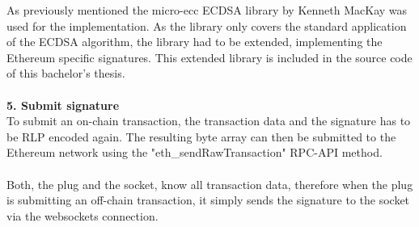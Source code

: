 As previously mentioned the micro-ecc ECDSA library by Kenneth MacKay was used for the implementation. As the library only covers the standard application of the ECDSA algorithm, the library had to be extended, implementing the Ethereum specific signatures. This extended library is included in the source code of this bachelor’s thesis.
\\\\
\textbf{5. Submit signature}\\
To submit an on-chain transaction, the transaction data and the signature has to be RLP encoded again. The resulting byte array can then be submitted to the Ethereum network using the "eth\_sendRawTransaction" RPC-API method.
\\\\
Both, the plug and the socket, know all transaction data, therefore when the plug is submitting an off-chain transaction, it simply sends the signature to the socket via the websockets connection.
\newpage

